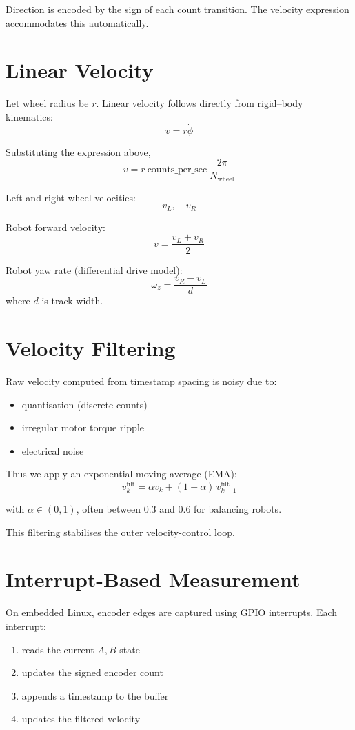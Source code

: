 \documentclass[11pt,a4paper]{article}
\begin{document}
Direction is encoded by the sign of each count transition.  
The velocity expression accommodates this automatically.

\section{Linear Velocity}

Let wheel radius be \( r \).  
Linear velocity follows directly from rigid--body kinematics:
\[
v = r \dot{\phi}
\]

Substituting the expression above,
\[
v = r\ \text{counts\_per\_sec}\ \frac{2\pi}{N_{\text{wheel}}}
\]

Left and right wheel velocities:
\[
v_L,\quad v_R
\]

Robot forward velocity:
\[
v = \frac{v_L + v_R}{2}
\]

Robot yaw rate (differential drive model):
\[
\omega_z = \frac{v_R - v_L}{d}
\]
where \( d \) is track width.

\section{Velocity Filtering}

Raw velocity computed from timestamp spacing is noisy due to:
\begin{itemize}
    \item quantisation (discrete counts)
    \item irregular motor torque ripple
    \item electrical noise
\end{itemize}

Thus we apply an exponential moving average (EMA):
\[
v_k^{\text{filt}} = 
\alpha v_k + (1 - \alpha)\, v_{k-1}^{\text{filt}}
\]

with \( \alpha \in (0,1) \), often between \( 0.3 \) and \( 0.6 \) for balancing robots.

This filtering stabilises the outer velocity-control loop.

\section{Interrupt-Based Measurement}

On embedded Linux, encoder edges are captured using GPIO interrupts.  
Each interrupt:
\begin{enumerate}
    \item reads the current \( A,B \) state
    \item updates the signed encoder count
    \item appends a timestamp to the buffer
    \item updates the filtered velocity
\end{enumerate}
\end{document}
